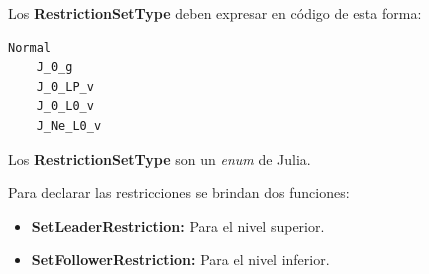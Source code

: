 Los \textbf{RestrictionSetType} deben expresar en código de esta forma:
\begin{lstlisting}[caption={Definir el conjunto de índice activo}]
    Normal 
    J_0_g 
    J_0_LP_v
    J_0_L0_v
    J_Ne_L0_v
\end{lstlisting}

Los \textbf{RestrictionSetType} son un \textit{enum} de Julia.


Para declarar las restricciones se brindan dos funciones:
\begin{itemize}
    \item \textbf{SetLeaderRestriction:} Para el nivel superior.
    \item \textbf{SetFollowerRestriction:} Para el nivel inferior.
\end{itemize}
